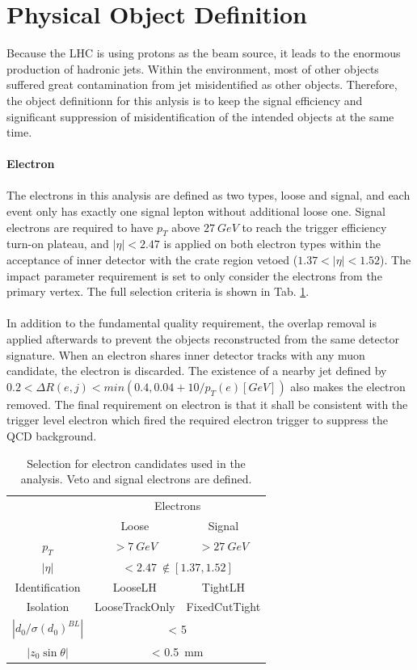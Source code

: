 \section{Physical Object Definition}
Because the LHC is using protons as the beam source, it leads to the enormous production of hadronic jets. Within the environment, most of other objects suffered great contamination from jet misidentified as other objects. Therefore, the object definitionn for this anlysis is to keep the signal efficiency and significant suppression of misidentification of the intended objects at the same time. 
\\
\\{\bf Electron}
\\
\\The electrons in this analysis are defined as two types, loose and signal, and each event only has exactly one signal lepton without additional loose one. Signal electrons are required to have $p_{T}$ above $27~GeV$ to reach the trigger efficiency turn-on plateau, and $|\eta|<2.47$ is applied on both electron types within the acceptance of inner detector with the crate region vetoed ($1.37<|\eta|<1.52$). The impact parameter requirement is set to only consider the electrons from the primary vertex. The full selection criteria is shown in Tab. \ref{Tab:eledefin}. 
\\
\\In addition to the fundamental quality requirement, the overlap removal is applied afterwards to prevent the objects reconstructed from the same detector signature. When an electron shares inner detector tracks with any muon candidate, the electron is discarded. The existence of a nearby jet defined by $0.2<\Delta R(e,j)<min(0.4,0.04+10/p_{T}(e)[GeV])$ also makes the electron removed. The final requirement on electron is that it shall be consistent with the trigger level electron which fired the required electron trigger to suppress the QCD background. 
\begin{table}[htb]
	\caption{Selection for electron candidates used in the analysis. Veto and signal electrons are defined.}\label{Tab:eledefin}
	\centering
	\begin{tabular}{|c||c|c|}
		\hline
		& \multicolumn{2}{c|}{ Electrons}\\
		&   Loose & Signal \\
		\hline
		$p_T$ & $>7~GeV$ & $>27~GeV$  \\
		\hline
		$| \eta |$ &  \multicolumn{2}{c|}{ $< 2.47 ~ \notin [1.37,1.52]$ } \\
		\hline
		Identification & LooseLH & TightLH   \\
		\hline
		Isolation       &   LooseTrackOnly & FixedCutTight  \\
		\hline
		$|d_0/\sigma(d_0)^{BL}|$ &   \multicolumn{2}{|c|}{  < 5}  \\
		\hline
		$|z_0\sin\theta| $  & \multicolumn{2}{|c|}{< 0.5~mm}  \\
		\hline
	\end{tabular}
\end{table}
